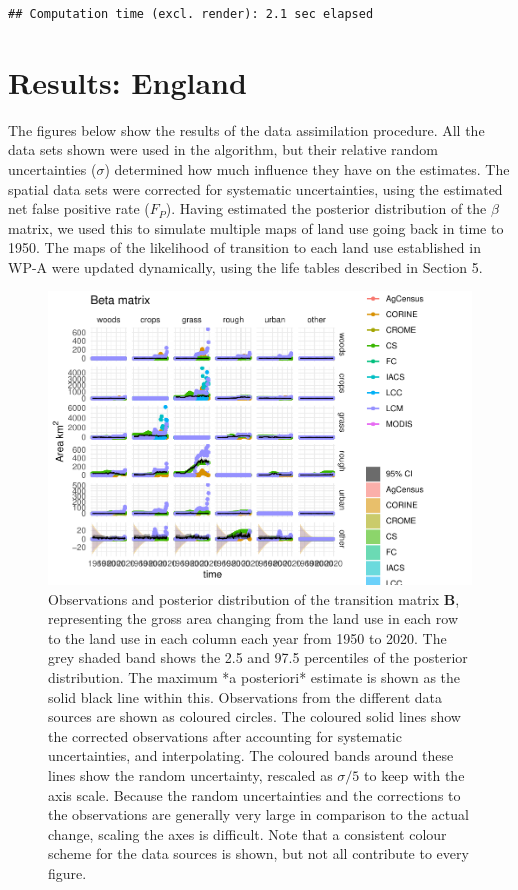 \documentclass[
]{book}
\begin{document}
\begin{verbatim}
## Computation time (excl. render): 2.1 sec elapsed
\end{verbatim}

\hypertarget{results-england}{%
\chapter{Results: England}\label{results-england}}

The figures below show the results of the data assimilation procedure. All the data sets shown were used in the algorithm, but their relative random uncertainties (\(\sigma\)) determined how much influence they have on the estimates. The spatial data sets were corrected for systematic uncertainties, using the estimated net false positive rate (\(F_P\)). Having estimated the posterior distribution of the \(\beta\) matrix, we used this to simulate multiple maps of land use going back in time to 1950. The maps of the likelihood of transition to each land use established in WP-A were updated dynamically, using the life tables described in Section 5.

\begin{figure}
\includegraphics[width=1.3\linewidth]{Results_en_files/figure-latex/plotB-1} \caption{ Observations and posterior distribution of the transition matrix $\mathbf{B}$, representing the gross area changing from the land use in each row to the land use in each column each year from 1950 to 2020. The grey shaded band shows the 2.5 and 97.5 percentiles of the posterior distribution. The maximum *a posteriori* estimate is shown as the solid black line within this. Observations from the different data sources are shown as coloured circles. The coloured solid lines show the corrected observations after accounting for systematic uncertainties, and interpolating. The coloured bands around these lines show the random uncertainty, rescaled as $\sigma /5$ to keep with the axis scale. Because the random uncertainties and the corrections to the observations are generally very large in comparison to the actual change, scaling the axes is difficult. Note that a consistent colour scheme for the data sources is shown, but not all contribute to every figure.}\label{fig:plotB}
\end{figure}
\end{document}

